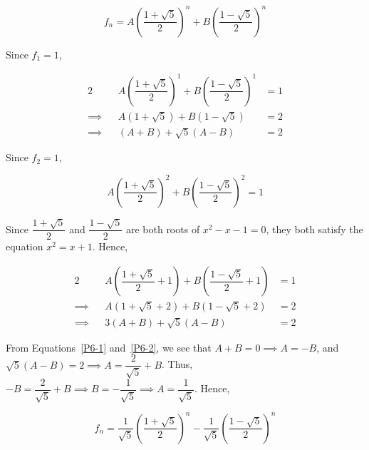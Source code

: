 \documentclass{echw}
\begin{document}
            \begin{equation*}
                f_n = A \left(\dfrac{1 + \sqrt5}{2}\right)^n + B \left(\dfrac{1 - \sqrt5}{2}\right)^n
            \end{equation*}

            Since $f_1 = 1$,

            \begin{alignat}{2}
                &&A \left(\dfrac{1 + \sqrt5}{2}\right)^1 + B  \left(\dfrac{1 - \sqrt5}{2}\right)^1 &= 1\nonumber\\
                \implies&&A (1 + \sqrt5) + B (1 - \sqrt5) &= 2\nonumber\\
                \implies&&(A + B) + \sqrt5(A - B) &= 2\label{P6-1}
            \end{alignat}

            Since $f_2 = 1$,

            \begin{equation*}
                A \left(\dfrac{1 + \sqrt5}{2}\right)^2 + B \left(\dfrac{1 - \sqrt5}{2}\right)^2 = 1
            \end{equation*}

            Since $\dfrac{1 + \sqrt5}{2}$ and $\dfrac{1 - \sqrt5}{2}$ are both roots of $x^2 - x - 1 = 0$, they both satisfy the equation $x^2 = x + 1$. Hence,

            \begin{alignat}{2}
                && A \left(\dfrac{1 + \sqrt5}{2} + 1\right) + B \left(\dfrac{1 - \sqrt5}{2} + 1\right) &= 1\nonumber\\
                \implies&& A (1 + \sqrt5 + 2) + B (1 - \sqrt5 + 2) &= 2\nonumber\\
                \implies&&3(A + B) + \sqrt5 (A - B) &= 2\label{P6-2}
            \end{alignat}

            From Equations~\ref{P6-1} and~\ref{P6-2}, we see that $A + B = 0 \implies A = -B$, and $\sqrt5 (A - B) = 2 \implies A = \dfrac2{\sqrt5} + B$. Thus, $-B = \dfrac2{\sqrt5} + B \implies B = -\dfrac1{\sqrt5} \implies A = \dfrac1{\sqrt5}$. Hence,

            \begin{equation*}
                f_n = \dfrac1{\sqrt5} \left(\dfrac{1 + \sqrt5}{2}\right)^n - \dfrac1{\sqrt5} \left(\dfrac{1 - \sqrt5}{2}\right)^n
            \end{equation*}

\end{document}
